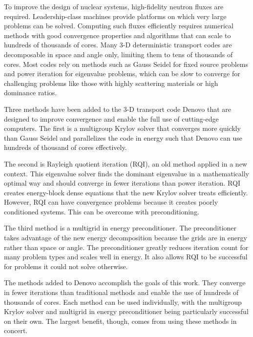 
\noindent       %
To improve the design of nuclear systems, high-fidelity neutron fluxes are required. Leadership-class machines provide platforms on which very large problems can be solved. Computing such fluxes efficiently requires numerical methods with good convergence properties and algorithms that can scale to hundreds of thousands of cores. Many 3-D deterministic transport codes are decomposable in space and angle only, limiting them to tens of thousands of cores. Most codes rely on methods such as Gauss Seidel for fixed source problems and power iteration for eigenvalue problems, which can be slow to converge for challenging problems like those with highly scattering materials or high dominance ratios. 

\vspace*{0.5em}
\noindent       %
Three methods have been added to the 3-D \Sn transport code Denovo that are designed to improve convergence and enable the full use of cutting-edge computers. The first is a multigroup Krylov solver that converges more quickly than Gauss Seidel and parallelizes the code in energy such that Denovo can use hundreds of thousand of cores effectively. 

\vspace*{0.5em}
\noindent       %
The second is Rayleigh quotient iteration (RQI), an old method applied in a new context. This eigenvalue solver finds the dominant eigenvalue in a mathematically optimal way and should converge in fewer iterations than power iteration. RQI creates energy-block dense equations that the new Krylov solver treats efficiently. However, RQI can have convergence problems because it creates poorly conditioned systems. This can be overcome with preconditioning. 

\vspace*{0.5em}
\noindent       %
The third method is a multigrid in energy preconditioner. The preconditioner takes advantage of the new energy decomposition because the grids are in energy rather than space or angle. The preconditioner greatly reduces iteration count for many problem types and scales well in energy. It also allows RQI to be successful for problems it could not solve otherwise. 

\vspace*{0.5em}
\noindent       %
The methods added to Denovo accomplish the goals of this work. They converge in fewer iterations than traditional methods and enable the use of hundreds of thousands of cores. Each method can be used individually, with the multigroup Krylov solver and multigrid in energy preconditioner being particularly successful on their own. The largest benefit, though, comes from using these methods in concert. 
